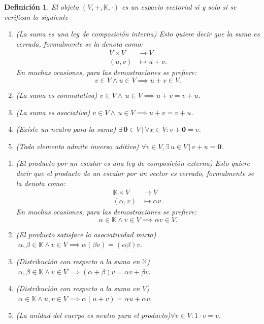 \documentclass[b5paper, 11pt]{book}
\newcommand{\0}{\mathbf{0}}
\newcommand{\K}{\mathds{K}}
\theoremstyle{estiloB}
\theoremstyle{estiloC}
\newtheorem{unadefi}{Definición}[chapter]
\theoremstyle{estiloD}
\theoremstyle{estiloE}
\begin{document}
\begin{unadefi}
El objeto $(V, +, \mathds{K}, \cdot)$ es un espacio vectorial si y solo si se verifican lo siguiente

\begin{enumerate}[label=\textbf{A\arabic*)}]
\item \textit{(La suma es una ley de composición interna)} Esto quiere decir que la suma es \textit{cerrada}, formalmente se la denota como:
\begin{align*}
V \times V 	&\to V\\
(u,v) 		&\mapsto u+v.
\end{align*}
En muchas ocasiones, para las demostraciones se prefiere:
\[ v \in V \wedge u \in V \implies u+v \in V. \]
\item \textit{(La suma es conmutativa)} 
\hfill $v \in V \wedge \, u \in V \implies u+v =v+u$.
\item \textit{(La suma es asociativa)}
\hfill $v \in V \wedge \, u \in V \implies u+v= v+u$. 
\item \textit{(Existe un neutro para la suma)}
\hfill $\exists \, \0 \in V \,|\, \forall x \in V : v+ \0= v$.
\item \textit{(Todo elemento admite inverso aditivo)} 
\hfill $\forall v \in V, \exists \, u \in V \,|\, v+ u = \0$.
\end{enumerate}

\begin{enumerate}[label=\textbf{M\arabic*)}]
\item \textit{(El producto por un escalar es una ley de composición externa)} Esto quiere decir que el producto de un escalar por un vector es \textit{cerrado}, formalmente se la denota como:
\begin{align*}
\mathds{K} \times V	&\to V\\
(\alpha , v)			&\mapsto \alpha v.			
\end{align*}
En muchas ocasiones, para las demostraciones se prefiere:
\[ \alpha \in \K \wedge v \in V \implies \alpha v \in V.\]

\item \textit{(El producto satisface la asociatividad mixta)}\\
\textcolor{white}{.}\hfill $\alpha , \beta \in \K \wedge v \in V \implies  \alpha (\beta v)= (\alpha \beta) v.$

\item \textit{(Distribución con respecto a la suma en $\K$)}\\
\textcolor{white}{.}\hfill $\alpha, \beta \in \K \wedge v \in V \implies (\alpha + \beta )v= \alpha v+ \beta v.$

\item \textit{(Distribución con respecto a la suma en $V$)}\\
\textcolor{white}{.}\hfill $\alpha \in \K \wedge u,v \in V \implies \alpha (u+v)= \alpha u+ \alpha v.$

\item \textit{(La unidad del cuerpo es neutro para el producto)}\hfill $\forall v \in V : 1 \cdot v= v.$
\end{enumerate}
\end{unadefi}
\end{document}
